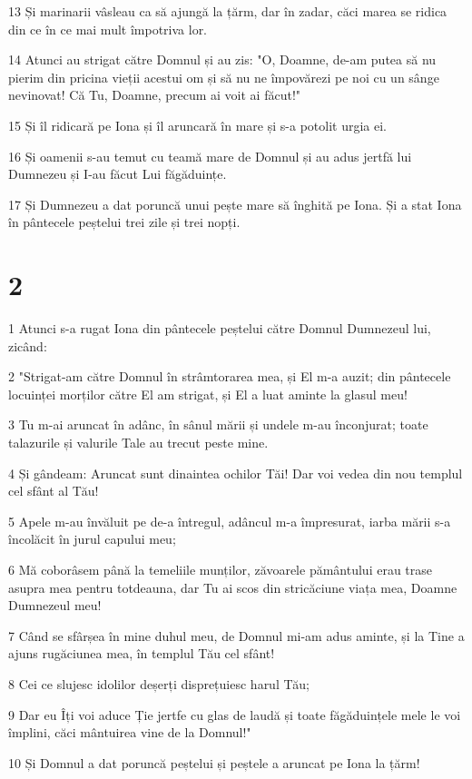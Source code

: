 \par 13 Și marinarii vâsleau ca să ajungă la țărm, dar în zadar, căci marea se ridica din ce în ce mai mult împotriva lor.
\par 14 Atunci au strigat către Domnul și au zis: "O, Doamne, de-am putea să nu pierim din pricina vieții acestui om și să nu ne împovărezi pe noi cu un sânge nevinovat! Că Tu, Doamne, precum ai voit ai făcut!"
\par 15 Și îl ridicară pe Iona și îl aruncară în mare și s-a potolit urgia ei.
\par 16 Și oamenii s-au temut cu teamă mare de Domnul și au adus jertfă lui Dumnezeu și I-au făcut Lui făgăduințe.
\par 17 Și Dumnezeu a dat poruncă unui pește mare să înghită pe Iona. Și a stat Iona în pântecele peștelui trei zile și trei nopți.

\chapter{2}

\par 1 Atunci s-a rugat Iona din pântecele peștelui către Domnul Dumnezeul lui, zicând:
\par 2 "Strigat-am către Domnul în strâmtorarea mea, și El m-a auzit; din pântecele locuinței morților către El am strigat, și El a luat aminte la glasul meu!
\par 3 Tu m-ai aruncat în adânc, în sânul mării și undele m-au înconjurat; toate talazurile și valurile Tale au trecut peste mine.
\par 4 Și gândeam: Aruncat sunt dinaintea ochilor Tăi! Dar voi vedea din nou templul cel sfânt al Tău!
\par 5 Apele m-au învăluit pe de-a întregul, adâncul m-a împresurat, iarba mării s-a încolăcit în jurul capului meu;
\par 6 Mă coborâsem până la temeliile munților, zăvoarele pământului erau trase asupra mea pentru totdeauna, dar Tu ai scos din stricăciune viața mea, Doamne Dumnezeul meu!
\par 7 Când se sfârșea în mine duhul meu, de Domnul mi-am adus aminte, și la Tine a ajuns rugăciunea mea, în templul Tău cel sfânt!
\par 8 Cei ce slujesc idolilor deșerți disprețuiesc harul Tău;
\par 9 Dar eu Îți voi aduce Ție jertfe cu glas de laudă și toate făgăduințele mele le voi împlini, căci mântuirea vine de la Domnul!"
\par 10 Și Domnul a dat poruncă peștelui și peștele a aruncat pe Iona la țărm!

